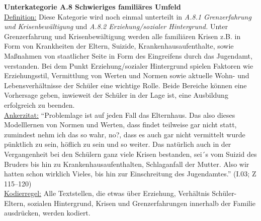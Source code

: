 \textbf{Unterkategorie A.8 Schwieriges familiäres Umfeld}\\
\underline{Definition:} Diese Kategorie wird noch einmal unterteilt in \textit{A.8.1 Grenzerfahrung und Krisenbewältigung} und \textit{A.8.2 Erziehung/sozialer Hintergrund.} Unter Grenzerfahrung und Krisenbewältigung werden alle familiären Krisen z.B. in Form von Krankheiten der Eltern, Suizide, Krankenhausaufenthalte, sowie Maßnahmen von staatlicher Seite in Form des Eingreifens durch das Jugendamt, verstanden. Bei dem Punkt Erziehung/sozialer Hintergrund spielen Faktoren wie Erziehungsstil, Vermittlung von Werten und Normen sowie aktuelle Wohn- und Lebensverhältnisse der Schüler eine wichtige Rolle. Beide Bereiche können eine Vorhersage geben, inwieweit der Schüler in der Lage ist, eine Ausbildung erfolgreich zu beenden.\\
\underline{Ankerzitat:} "`Problemlage ist auf jeden Fall das Elternhaus. Das also dieses Modelllernen von Normen und Werten, dass findet teilweise gar nicht statt, zumindest nehm ich das so wahr, no?, dass es auch gar nicht vermittelt wurde pünktlich zu sein, höflich zu sein und so weiter. Das natürlich auch in der Vergangenheit bei den Schülern ganz viele Krisen bestanden, sei´s vom Suizid des Bruders bis hin zu Krankenhausaufenthalten, Schlaganfall der Mutter. Also wir hatten schon wirklich Vieles, bis hin zur Einschreitung des Jugendamtes."' (I.03; Z 115--120)\\
\underline{Kodierregel:} Alle Textstellen, die etwas über Erziehung, Verhältnis Schüler-Eltern, sozialen Hintergrund, Krisen und Grenzerfahrungen innerhalb der Familie ausdrücken, werden kodiert.\\

